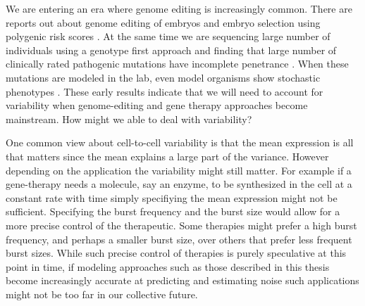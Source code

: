 We are entering an era where genome editing is increasingly common. There are reports out about genome editing of embryos and embryo selection using polygenic risk scores \cite{ma2017n}\cite{pereira2022hr}. At the same time we are sequencing large number of individuals using a genotype first approach and finding that large number of clinically rated pathogenic mutations have incomplete penetrance \cite{Forrest}. When these mutations are modeled in the lab, even model organisms show stochastic phenotypes \cite{Current biology article}. These early results indicate that we will need to account for variability when genome-editing and gene therapy approaches become mainstream. How might we able to deal with variability?

One common view about cell-to-cell variability is that the mean expression is all that matters since the mean explains a large part of the variance. However depending on the application the variability might still matter. For example if a gene-therapy needs a molecule, say an enzyme, to be synthesized in the cell at a constant rate with time simply specifiying the mean expression might not be sufficient. Specifying the burst frequency and the burst size would allow for a more precise control of the therapeutic. Some therapies might prefer a high burst frequency, and perhaps a smaller burst size, over others that prefer less frequent burst sizes. While such precise control of therapies is purely speculative at this point in time, if modeling approaches such as those described in this thesis become increasingly accurate at predicting and estimating noise such applications might not be too far in our collective future.
